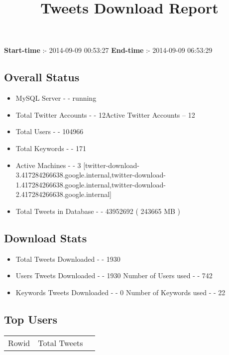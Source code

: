 \documentclass{article}\usepackage[T1]{fontenc}
\begin{document}
\title{\textbf{Tweets Download Report}}
               \date{}
                \maketitle
               \centerline{\textbf{Start-time} :- 2014-09-09 00:53:27 \hspace{40pt} \textbf{End-time} :- 2014-09-09 06:53:29}               \subsection*{Overall Status}                \begin{itemize}                \item MySQL Server - - running               \item Total Twitter Accounts - - 12\newline Active Twitter Accounts -- 12               \item Total Users - - 104966               \item Total Keywords - - 171               \item Active Machines - - 3 [twitter-download-3.417284266638.google.internal,twitter-download-1.417284266638.google.internal,twitter-download-2.417284266638.google.internal]               \item Total Tweets in Database - - 43952692 ( 243665 MB )               \end{itemize}               \subsection*{Download Stats}                \begin{itemize}                \item Total Tweets Downloaded - - 1930               \item Users Tweets Downloaded - - 1930 \newline Number of Users used - - 742               \item Keywords Tweets Downloaded - - 0 \newline Number of Keywords used - - 22              \end{itemize}              \subsection*{Top Users}\begin{tabular}{|c|c|c|}         \hline         Rowid & Total Tweets \\ 

\end{tabular}
\end{document}
